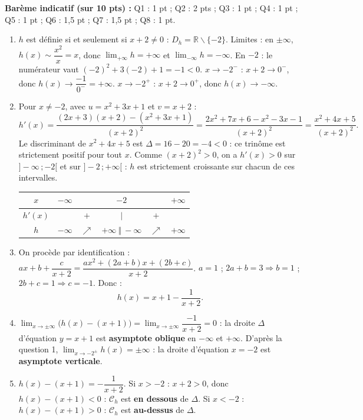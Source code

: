 \documentclass[11pt]{article}
\def\setminus{\mathbin{\backslash}}\let\smallsetminus\setminus
\begin{document}
\begin{corrige}
\textbf{Barème indicatif (sur 10 pts) :} Q1 : 1 pt ; Q2 : 2 pts ; Q3 : 1 pt ; Q4 : 1 pt ; Q5 : 1 pt ; Q6 : 1,5 pt ; Q7 : 1,5 pt ; Q8 : 1 pt.

\begin{enumerate}
\item $h$ est définie si et seulement si $x+2\neq 0$ : $D_h=\mathbb{R}\setminus\{-2\}$.
Limites : en $\pm\infty$, $h(x)\sim \dfrac{x^2}{x}=x$, donc $\lim_{+\infty}h=+\infty$ et $\lim_{-\infty}h=-\infty$.
En $-2$ : le numérateur vaut $(-2)^2+3(-2)+1=-1<0$.
$x\to -2^-$ : $x+2\to 0^-$, donc $h(x)\to \dfrac{-1}{0^-}=+\infty$.
$x\to -2^+$ : $x+2\to 0^+$, donc $h(x)\to -\infty$.

\item Pour $x\neq -2$, avec $u=x^2+3x+1$ et $v=x+2$ :
\[ h'(x)=\frac{(2x+3)(x+2)-(x^2+3x+1)}{(x+2)^2}=\frac{2x^2+7x+6-x^2-3x-1}{(x+2)^2}=\frac{x^2+4x+5}{(x+2)^2}. \]
Le discriminant de $x^2+4x+5$ est $\Delta=16-20=-4<0$ : ce trinôme est strictement positif pour tout $x$. Comme $(x+2)^2>0$, on a $h'(x)>0$ sur $]-\infty\,;-2[$ et sur $]-2\,;+\infty[$ : $h$ est strictement croissante sur chacun de ces intervalles.
\begin{center}
\begin{tabular}{|c|ccccc|}\hline
$x$ & $-\infty$ & & $-2$ & & $+\infty$ \\ \hline
$h'(x)$ & & $+$ & $\vert$ & $+$ & \\ \hline
$h$ & $-\infty$ & $\nearrow$ & $+\infty\ \Vert\ -\infty$ & $\nearrow$ & $+\infty$ \\ \hline
\end{tabular}
\end{center}

\item On procède par identification : $ax+b+\dfrac{c}{x+2}=\dfrac{ax^2+(2a+b)x+(2b+c)}{x+2}$.
$a=1$ ; $2a+b=3\Rightarrow b=1$ ; $2b+c=1\Rightarrow c=-1$. Donc :
\[ h(x)=x+1-\frac{1}{x+2}. \]

\item $\lim_{x\to\pm\infty}\big(h(x)-(x+1)\big)=\lim_{x\to\pm\infty}\dfrac{-1}{x+2}=0$ : la droite $\Delta$ d'équation $y=x+1$ est \textbf{asymptote oblique} en $-\infty$ et $+\infty$.
D'après la question 1, $\lim_{x\to -2^\pm}h(x)=\pm\infty$ : la droite d'équation $x=-2$ est \textbf{asymptote verticale}.

\item $h(x)-(x+1)=-\dfrac{1}{x+2}$.
Si $x>-2$ : $x+2>0$, donc $h(x)-(x+1)<0$ : $\mathcal{C}_h$ est \textbf{en dessous} de $\Delta$.
Si $x<-2$ : $h(x)-(x+1)>0$ : $\mathcal{C}_h$ est \textbf{au-dessus} de $\Delta$.


\end{enumerate}
\end{corrige}
\end{document}
